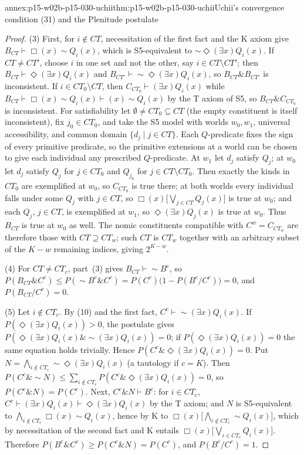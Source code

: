 \begin{annexitem}{annex:p15-w02b-p15-030-uchii}{thm:p15-w02b-p15-030-uchii}{Uchii's convergence condition (31) and the Plenitude postulate}
\begin{proof}
(3) First, for \(i\notin CT\), necessitation of the first fact and the K
axiom give \(B_{CT}\vdash\Box(x)\sim Q_i(x)\), which is S5-equivalent to
\(\sim\Diamond(\exists x)Q_i(x)\). If \(CT\neq CT'\), choose \(i\) in one set and
not the other, say \(i\in CT\setminus CT'\); then \(B_{CT}\vdash\Diamond(\exists x)Q_i(x)\)
and \(B_{CT'}\vdash\sim\Diamond(\exists x)Q_i(x)\), so \(B_{CT}\&B_{CT'}\) is
inconsistent. If \(i\in CT_0\setminus CT\), then \(C_{CT_0}\vdash(\exists x)Q_i(x)\)
while \(B_{CT}\vdash\Box(x)\sim Q_i(x)\vdash(x)\sim Q_i(x)\) by the T axiom of S5,
so \(B_{CT}\&C_{CT_0}\) is inconsistent. For satisfiability let
\(\emptyset\neq CT_0\subseteq CT\) (the empty constituent is itself
inconsistent), fix \(j_0\in CT_0\), and take the S5 model with worlds
\(w_0,w_1\), universal accessibility, and common domain
\(\{d_j\mid j\in CT\}\). Each \(Q\)-predicate fixes the sign of every primitive
predicate, so the primitive extensions at a world can be chosen to give
each individual any prescribed \(Q\)-predicate. At \(w_1\) let \(d_j\) satisfy
\(Q_j\); at \(w_0\) let \(d_j\) satisfy \(Q_j\) for \(j\in CT_0\) and \(Q_{j_0}\) for
\(j\in CT\setminus CT_0\). Then exactly the kinds in \(CT_0\) are exemplified
at \(w_0\), so \(C_{CT_0}\) is true there; at both worlds every individual
falls under some \(Q_j\) with \(j\in CT\), so \(\Box(x)\bigl[\bigvee_{j\in CT}Q_j(x)\bigr]\)
is true at \(w_0\); and each \(Q_j\), \(j\in CT\), is exemplified at \(w_1\), so
\(\Diamond(\exists x)Q_j(x)\) is true at \(w_0\). Thus \(B_{CT}\) is true at
\(w_0\) as well. The nomic constituents compatible with \(C^w=C_{CT_w}\) are
therefore those with \(CT\supseteq CT_w\); such \(CT\) is \(CT_w\) together with
an arbitrary subset of the \(K-w\) remaining indices, giving \(2^{K-w}\).

(4) For \(CT\neq CT_c\), part~(3) gives \(B_{CT}\vdash\sim B^c\), so
\(P(B_{CT}\&C^c)\leq P(\sim B^c\&C^c)=P(C^c)\bigl(1-P(B^c/C^c)\bigr)=0\), and
\(P(B_{CT}/C^c)=0\).

(5) Let \(i\notin CT_c\). By (10) and the first fact, \(C^c\vdash\sim(\exists x)Q_i(x)\).
If \(P(\Diamond(\exists x)Q_i(x))>0\), the postulate gives
\(P(\Diamond(\exists x)Q_i(x)\&\sim(\exists x)Q_i(x))=0\); if
\(P(\Diamond(\exists x)Q_i(x))=0\) the same equation holds trivially. Hence
\(P(C^c\&\Diamond(\exists x)Q_i(x))=0\). Put
\(N=\bigwedge_{i\notin CT_c}\sim\Diamond(\exists x)Q_i(x)\) (a tautology if \(c=K\)).
Then \(P(C^c\&\sim N)\leq\sum_{i\notin CT_c}P(C^c\&\Diamond(\exists x)Q_i(x))=0\),
so \(P(C^c\&N)=P(C^c)\). Next, \(C^c\&N\vdash B^c\): for \(i\in CT_c\),
\(C^c\vdash(\exists x)Q_i(x)\vdash\Diamond(\exists x)Q_i(x)\) by the T axiom;
and \(N\) is S5-equivalent to \(\bigwedge_{i\notin CT_c}\Box(x)\sim Q_i(x)\), hence
by K to \(\Box(x)\bigl[\bigwedge_{i\notin CT_c}\sim Q_i(x)\bigr]\), which by
necessitation of the second fact and K entails
\(\Box(x)\bigl[\bigvee_{i\in CT_c}Q_i(x)\bigr]\). Therefore
\(P(B^c\&C^c)\geq P(C^c\&N)=P(C^c)\), and \(P(B^c/C^c)=1\).
\end{proof}
\end{annexitem}

